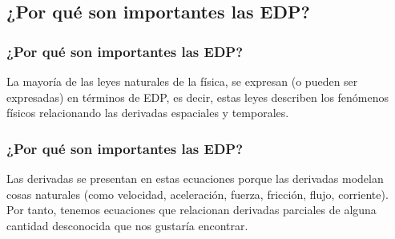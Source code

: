 \documentclass[12pt]{beamer}
\begin{document}

\subsection{¿Por qué son importantes las EDP?}

\begin{frame}
\frametitle{¿Por qué son importantes las EDP?}
La mayoría de las leyes naturales de la física, se expresan (o pueden ser expresadas) en términos de EDP, es decir, estas leyes describen los fenómenos físicos relacionando las derivadas espaciales y temporales.
\end{frame}
\begin{frame}
\frametitle{¿Por qué son importantes las EDP?}
Las derivadas se presentan en estas ecuaciones porque las derivadas modelan cosas naturales (como velocidad, aceleración, fuerza, fricción, flujo, corriente). 
\\
\bigskip
\pause
Por tanto, tenemos ecuaciones que relacionan derivadas parciales de alguna cantidad desconocida que nos gustaría encontrar.
\end{frame}
\end{document}

